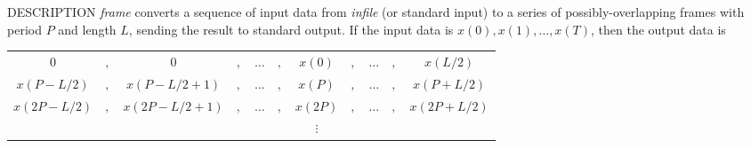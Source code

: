 % 
% 
% 
% 
%                                                                        
%

\begin{synopsis}
 \item [frame] [ --l $L$ ] [ --n ] [ --p $P$ ] [ +{\em type} ] [ {\em infile} ]
\end{synopsis}

\begin{qsection}{DESCRIPTION}
{\em frame} converts a sequence of input data 
from {\em infile} (or standard input) 
to a series of possibly-overlapping frames with period $P$ and length $L$, 
sending the result to standard output.
If the input data is $x(0),x(1),\ldots,x(T)$, then the output data is
\begin{center}
\begin{tabular}{ccccccccccc}
$0$&$,$&$0$&$,$&$\ldots$&$,$&$x(0)$&$,$&$\ldots$&$,$&$x(L/2)$\\
$x(P-L/2)$&$,$&$x(P-L/2+1)$&$,$&$\ldots$&$,$&$x(P)$&$,$&$\ldots$&$,$&$x(P+L/2)$\\
$x(2P-L/2)$&$,$&$x(2P-L/2+1)$&$,$&$\ldots$&$,$&$x(2P)$&$,$&$\ldots$&$,$&$x(2P+L/2)$\\
&&&&&&$\vdots$&&&&
\end{tabular}
\end{center}

\end{qsection}

